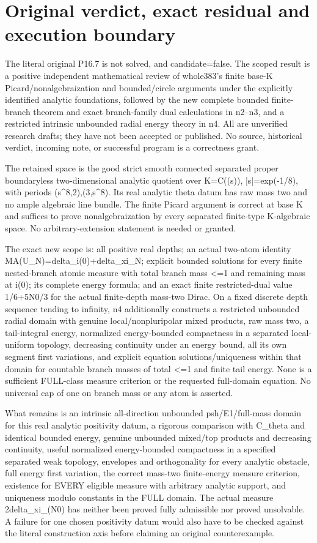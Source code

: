 \documentclass[11pt]{article}
\begin{document}
\section*{Original verdict, exact residual and execution boundary}

The literal original P16.7 is not solved, and candidate=false. The scoped result is a positive independent mathematical review of whole383's finite base-K Picard/nonalgebraization and bounded/circle arguments under the explicitly identified analytic foundations, followed by the new complete bounded finite-branch theorem and exact branch-family dual calculations in n2--n3, and a restricted intrinsic unbounded radial energy theory in n4. All are unverified research drafts; they have not been accepted or published. No source, historical verdict, incoming note, or successful program is a correctness grant.

The retained space is the good strict smooth connected separated proper boundaryless two-dimensional analytic quotient over K=C((s)), |s|=exp(-1/8), with periods (s\textasciicircum{}8,2),(3,s\textasciicircum{}8). Its real analytic theta datum has raw mass two and no ample algebraic line bundle. The finite Picard argument is correct at base K and suffices to prove nonalgebraization by every separated finite-type K-algebraic space. No arbitrary-extension statement is needed or granted.

The exact new scope is: all positive real depths; an actual two-atom identity MA(U\_N)=delta\_i(0)+delta\_xi\_N; explicit bounded solutions for every finite nested-branch atomic measure with total branch mass <=1 and remaining mass at i(0); its complete energy formula; and an exact finite restricted-dual value 1/6+5N0/3 for the actual finite-depth mass-two Dirac. On a fixed discrete depth sequence tending to infinity, n4 additionally constructs a restricted unbounded radial domain with genuine local/nonpluripolar mixed products, raw mass two, a tail-integral energy, normalized energy-bounded compactness in a separated local-uniform topology, decreasing continuity under an energy bound, all its own segment first variations, and explicit equation solutions/uniqueness within that domain for countable branch masses of total <=1 and finite tail energy. None is a sufficient FULL-class measure criterion or the requested full-domain equation. No universal cap of one on branch mass or any atom is asserted.

What remains is an intrinsic all-direction unbounded psh/E1/full-mass domain for this real analytic positivity datum, a rigorous comparison with C\_theta and identical bounded energy, genuine unbounded mixed/top products and decreasing continuity, useful normalized energy-bounded compactness in a specified separated weak topology, envelopes and orthogonality for every analytic obstacle, full energy first variation, the correct mass-two finite-energy measure criterion, existence for EVERY eligible measure with arbitrary analytic support, and uniqueness modulo constants in the FULL domain. The actual measure 2delta\_xi\_(N0) has neither been proved fully admissible nor proved unsolvable. A failure for one chosen positivity datum would also have to be checked against the literal construction axis before claiming an original counterexample.
\end{document}
